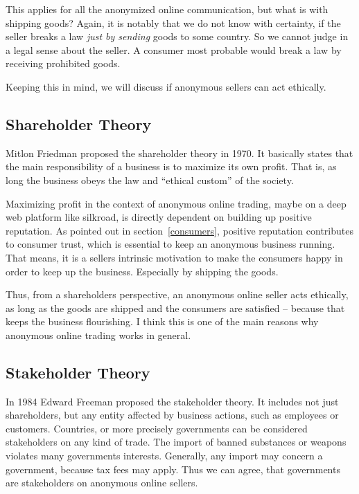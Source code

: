 This applies for all the anonymized online communication, but what is with shipping goods? Again, it is notably that we do not know with certainty, if the seller breaks a law \emph{just by sending} goods to some country. So we cannot judge in a legal sense about the seller. A consumer most probable would break a law by receiving prohibited goods.

Keeping this in mind, we will discuss if anonymous sellers can act ethically.

\subsection{Shareholder Theory}

Mitlon Friedman proposed the shareholder theory in 1970. It basically states that the main responsibility of a business is to maximize its own profit. That is, as long the business obeys the law and ``ethical custom'' of the society\cite{shareholder}. 

Maximizing profit in the context of anonymous online trading, maybe on a deep web platform like silkroad, is directly dependent on building up positive reputation. As pointed out in section~\ref{consumers}, positive reputation contributes to consumer trust, which is essential to keep an anonymous business running. That means, it is a sellers intrinsic motivation to make the consumers happy in order to keep up the business. Especially by shipping the goods.

Thus, from a shareholders perspective, an anonymous online seller acts ethically, as long as the goods are shipped and the consumers are satisfied -- because that keeps the business flourishing. I think this is one of the main reasons why anonymous online trading works in general.

\subsection{Stakeholder Theory}

In 1984 Edward Freeman proposed the stakeholder theory\cite{stakeholder}. It includes not just shareholders, but any entity affected by business actions, such as employees or customers. Countries, or more precisely governments can be considered stakeholders on any kind of trade. The import of banned substances or weapons violates many governments interests. Generally, any import may concern a government, because tax fees may apply. Thus we can agree, that governments are stakeholders on anonymous online sellers. 

